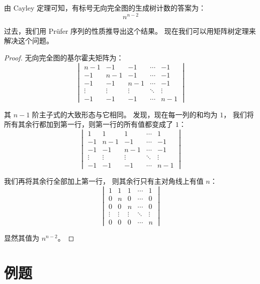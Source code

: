 \documentclass[UTF8]{article}
\begin{document}
	由 Cayley 定理可知，有标号无向完全图的生成树计数的答案为：
	$$
	n^{n - 2}
	$$

	过去，我们用 Prüfer 序列的性质推导出这个结果。
	现在我们可以用矩阵树定理来解决这个问题。

	\begin{proof}
		无向完全图的基尔霍夫矩阵为：
		\begin{equation*}
			\begin{vmatrix}
				n - 1 & -1 & -1 & \cdots & -1
				\\
				-1 & n - 1 & -1 & \cdots & -1
				\\
				-1 & -1 & n - 1 & \cdots & -1
				\\
				\vdots & \vdots & \vdots & \ddots & \vdots
				\\
				-1 & -1 & -1 & \cdots & n - 1
			\end{vmatrix}
		\end{equation*}

		其 $n - 1$ 阶主子式的大致形态与它相同。
		发现，现在每一列的和均为 $1$，
		我们将所有其余行都加到第一行，则第一行的所有值都变成了 $1$：
		\begin{equation*}
			\begin{vmatrix}
				1 & 1 & 1 & \cdots & 1
				\\
				-1 & n - 1 & -1 & \cdots & -1
				\\
				-1 & -1 & n - 1 & \cdots & -1
				\\
				\vdots & \vdots & \vdots & \ddots & \vdots
				\\
				-1 & -1 & -1 & \cdots & n - 1
			\end{vmatrix}
		\end{equation*}

		我们再将其余行全部加上第一行，
		则其余行只有主对角线上有值 $n$：
		\begin{equation*}
			\begin{vmatrix}
				1 & 1 & 1 & \cdots & 1
				\\
				0 & n & 0 & \cdots & 0
				\\
				0 & 0 & n & \cdots & 0
				\\
				\vdots & \vdots & \vdots & \ddots & \vdots
				\\
				0 & 0 & 0 & \cdots & n
			\end{vmatrix}
		\end{equation*}

		显然其值为 $n^{n - 2}$。
	\end{proof}

	\section{例题}
\end{document}
